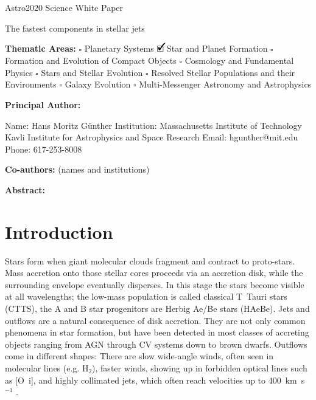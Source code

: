 \documentclass[12pt]{article}
\newcommand{\cmark}{\ding{51}}%
\newcommand{\done}{\rlap{$\square$}{\raisebox{2pt}{\large\hspace{1pt}\cmark}}%
\hspace{-2.5pt}}
\begin{document}
\raggedright
\huge
Astro2020 Science White Paper \linebreak

The fastest components in stellar jets \linebreak
\normalsize

\noindent \textbf{Thematic Areas:} \hspace*{60pt} $\square$ Planetary Systems \hspace*{10pt} $\done$ Star and Planet Formation \hspace*{20pt}\linebreak
$\square$ Formation and Evolution of Compact Objects \hspace*{31pt} $\square$ Cosmology and Fundamental Physics \linebreak
  $\square$  Stars and Stellar Evolution \hspace*{1pt} $\square$ Resolved Stellar Populations and their Environments \hspace*{40pt} \linebreak
  $\square$    Galaxy Evolution   \hspace*{45pt} $\square$             Multi-Messenger Astronomy and Astrophysics \hspace*{65pt} \linebreak
  
\textbf{Principal Author:}

Name:	Hans Moritz G\"unther
 \linebreak						
Institution: Massachusetts Institute of Technology
Kavli Institute for Astrophysics and Space Research 
 \linebreak
Email: hgunther@mit.edu
 \linebreak
Phone:  617-253-8008
 \linebreak
 
\textbf{Co-authors:} (names and institutions)
  \linebreak

\textbf{Abstract:}


\pagebreak
\section{Introduction}
Stars form when giant molecular clouds fragment and contract to
proto-stars. Mass accretion onto those stellar cores proceeds via an accretion
disk, while the surrounding envelope eventually disperses. In this stage the
stars become visible at all wavelengths; the low-mass population is called
classical T~Tauri stars (CTTS), the A and B star progenitors are Herbig Ae/Be
stars (HAeBe). Jets and outflows are a natural consequence of disk
accretion. They are not only common phenomena in star formation, but have been
detected in most classes of accreting objects ranging from AGN through CV
systems down to brown dwarfs. Outflows come in different shapes: There are slow
wide-angle winds, often seen in molecular lines (e.g. H$_2$), faster winds,
showing up in forbidden optical lines such as [O~{\sc i}], and highly collimated jets, which often reach velocities up to 400~km~s$^{-1}$ \citep{1998AJ....115.1554E}.
\end{document}
